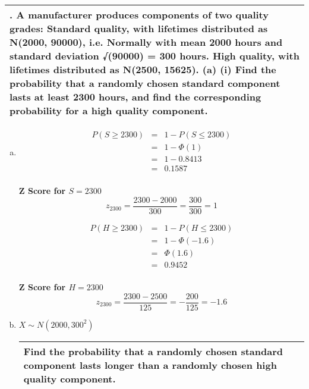 \documentclass[a4paper,12pt]{article}
\begin{document}
\begin{table}[ht!]
 \centering
 \begin{tabular}{|p{15cm}|}
 \hline
\noindent 3. A manufacturer produces components of two quality grades:
Standard quality, with lifetimes distributed as N(2000, 90000), i.e.
Normally with mean 2000 hours and standard deviation √(90000) = 300
hours.
High quality, with lifetimes distributed as N(2500, 15625).
(a) (i) Find the probability that a randomly chosen standard component
lasts at least 2300 hours, and find the corresponding probability for
a high quality component.
\\ \hline
  \end{tabular}
\end{table}




\begin{enumerate}[(a)]
\item
\begin{multicols}{2}
\begin{eqnarray*}
P( S \geq 2300) &=& 1- P (S \leq 2300)\\
&=& 1-\Phi(1)\\
&=& 1- 0.8413 \\
&=& 0.1587 \\
\end{eqnarray*}
\begin{framed}
\noindent \textbf{Z Score for $S = 2300$}
\[z_{2300}  = \frac{2300 - 2000}{ 300}  = \frac{300}{300} = 1\]
\end{framed}
\begin{eqnarray*}
P( H \geq 2300) &=& 1- P (H \leq 2300)\\
&=& 1-\Phi(-1.6)\\
&=& \Phi(1.6) \\
&=& 0.9452 \\
\end{eqnarray*}
\begin{framed}
\noindent \textbf{Z Score for $H = 2300$}
\[z_{2300}  = \frac{2300 - 2500}{125}  = -\frac{200}{125} = -1.6\]
\end{framed}
\end{multicols}


\item  $X \sim N(2000,300^2)$

\begin{table}[ht!]
 \centering
 \begin{tabular}{|p{15cm}|}
 \hline
\noindent  Find the probability that a randomly chosen standard component
lasts longer than a randomly chosen high quality component.
\\ \hline
  \end{tabular}
\end{table}


\end{enumerate}
\end{document}

